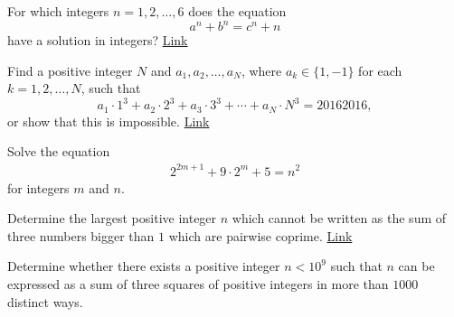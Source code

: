 \begin{problem}
	For which integers $n = 1,2,\ldots, 6$ does the equation \[a^n + b^n = c^n + n\] have a solution in integers? \hfill \href{https://artofproblemsolving.com/community/c6h1334536p7212068}{Link}
\end{problem}

\begin{problem}
	Find a positive integer $N$ and $a_1, a_2, \ldots, a_N$, where $a_k \in \{1, -1\}$ for each $k=1,2,\ldots,N$, such that \[a_1 \cdot 1^3 + a_2 \cdot 2^3 + a_3 \cdot 3^3 + \cdots + a_N \cdot N^3 = 20162016,\] or show that this is impossible. \hfill \href{http://artofproblemsolving.com/community/c6h1203525p5929703}{Link}
\end{problem}



\begin{problem}
	Solve the equation
	\begin{align*}
	2^{2m+1}+9\cdot 2^m+5=n^2
	\end{align*}
	for integers $m$ and $n$.
\end{problem}


\begin{problem}
	Determine the largest positive integer $n$ which cannot be written as the sum of three numbers bigger than $1$ which are pairwise coprime. \hfill \href{http://artofproblemsolving.com/community/c6h1243220p6360359}{Link}
\end{problem}



\begin{problem}
	Determine whether there exists a positive integer $n<10^9$ such that $n$ can be expressed as a sum of three squares of positive integers in more than $1000$ distinct ways.
\end{problem}

